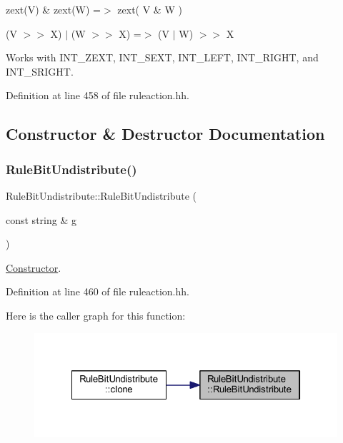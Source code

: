 \begin{DoxyItemize}
\item {\ttfamily zext(\+V) \& zext(\+W) =$>$ zext( V \& W )}
\item {\ttfamily (V $>$$>$ X) $\vert$ (W $>$$>$ X) =$>$ (V $\vert$ W) $>$$>$ X}
\end{DoxyItemize}

Works with I\+N\+T\+\_\+\+Z\+E\+XT, I\+N\+T\+\_\+\+S\+E\+XT, I\+N\+T\+\_\+\+L\+E\+FT, I\+N\+T\+\_\+\+R\+I\+G\+HT, and I\+N\+T\+\_\+\+S\+R\+I\+G\+HT. 

Definition at line 458 of file ruleaction.\+hh.



\subsection{Constructor \& Destructor Documentation}
\mbox{\label{class_rule_bit_undistribute_a2159c6998ef524f7ea09b573a08eed3b}} 
\subsubsection{\texorpdfstring{RuleBitUndistribute()}{RuleBitUndistribute()}}
{\footnotesize\ttfamily Rule\+Bit\+Undistribute\+::\+Rule\+Bit\+Undistribute (\begin{DoxyParamCaption}\item[{const string \&}]{g }\end{DoxyParamCaption})\hspace{0.3cm}{\ttfamily [inline]}}



\mbox{\hyperlink{class_constructor}{Constructor}}. 



Definition at line 460 of file ruleaction.\+hh.

Here is the caller graph for this function\+:
\nopagebreak
\begin{figure}[H]
\begin{center}
\leavevmode
\includegraphics[width=322pt]{class_rule_bit_undistribute_a2159c6998ef524f7ea09b573a08eed3b_icgraph}
\end{center}
\end{figure}


